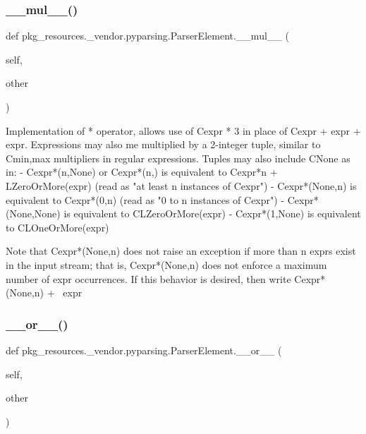 \subsubsection{\texorpdfstring{\+\_\+\+\_\+mul\+\_\+\+\_\+()}{\_\_mul\_\_()}}
{\footnotesize\ttfamily def pkg\+\_\+resources.\+\_\+vendor.\+pyparsing.\+Parser\+Element.\+\_\+\+\_\+mul\+\_\+\+\_\+ (\begin{DoxyParamCaption}\item[{}]{self,  }\item[{}]{other }\end{DoxyParamCaption})}

\begin{DoxyVerb}Implementation of * operator, allows use of C{expr * 3} in place of
C{expr + expr + expr}.  Expressions may also me multiplied by a 2-integer
tuple, similar to C{{min,max}} multipliers in regular expressions.  Tuples
may also include C{None} as in:
 - C{expr*(n,None)} or C{expr*(n,)} is equivalent
      to C{expr*n + L{ZeroOrMore}(expr)}
      (read as "at least n instances of C{expr}")
 - C{expr*(None,n)} is equivalent to C{expr*(0,n)}
      (read as "0 to n instances of C{expr}")
 - C{expr*(None,None)} is equivalent to C{L{ZeroOrMore}(expr)}
 - C{expr*(1,None)} is equivalent to C{L{OneOrMore}(expr)}

Note that C{expr*(None,n)} does not raise an exception if
more than n exprs exist in the input stream; that is,
C{expr*(None,n)} does not enforce a maximum number of expr
occurrences.  If this behavior is desired, then write
C{expr*(None,n) + ~expr}
\end{DoxyVerb}
 \mbox{\label{classpkg__resources_1_1__vendor_1_1pyparsing_1_1_parser_element_a788f11bd1e90390125a501e74e786fe9}} 
\subsubsection{\texorpdfstring{\+\_\+\+\_\+or\+\_\+\+\_\+()}{\_\_or\_\_()}}
{\footnotesize\ttfamily def pkg\+\_\+resources.\+\_\+vendor.\+pyparsing.\+Parser\+Element.\+\_\+\+\_\+or\+\_\+\+\_\+ (\begin{DoxyParamCaption}\item[{}]{self,  }\item[{}]{other }\end{DoxyParamCaption})}

